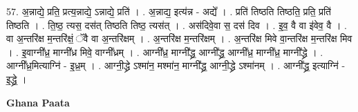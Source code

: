 \documentclass[17pt]{extarticle}
\begin{document}
57. अ॒न्नाद्ये॒ प्रति॒ प्रत्य॒न्नाद्ये॒ ऽन्नाद्ये॒ प्रति॑ । . अ॒न्नाद्य॒ इत्य॑न्न - अद्ये᳚ । . प्रति॑ तिष्ठति तिष्ठति॒ प्रति॒ प्रति॑ तिष्ठति । . ति॒ष्ठ॒ त्यस॒ दस॑त् तिष्ठति तिष्ठ॒ त्यस॑त् । . अस॑दिवे॒वा स॒ दस॑ दिव । . इ॒व॒ वै वा इ॑वेव॒ वै । . वा अ॒न्तरि॑क्ष म॒न्तरि॑क्षं॒ ॅवै वा अ॒न्तरि॑क्षम् । . अ॒न्तरि॑क्ष म॒न्तरि॑क्षम् । . अ॒न्तरि॑क्ष मिवे वा॒न्तरि॑क्ष म॒न्तरि॑क्ष मिव । . इ॒वाग्नी᳚ध्र॒ माग्नी᳚ध्र मिवे॒ वाग्नी᳚ध्रम् । . आग्नी᳚ध्र॒ माग्नी᳚द्ध्र॒ आग्नी᳚द्ध्र॒ आग्नी᳚ध्र॒ माग्नी᳚ध्र॒ माग्नी᳚द्ध्रे । . आग्नी᳚ध्र॒मित्याग्नि॑ - इ॒ध्र॒म् । . आग्नी॒द्ध्रे ऽश्मा॑न॒ मश्मा॑न॒ माग्नी᳚द्ध्र॒ आग्नी॒द्ध्रे ऽश्मा॑नम् । . आग्नी᳚द्ध्र॒ इत्याग्नि॑ - इ॒द्ध्रे॒ । \newline

\textbf{Ghana Paata } \newline
\end{document}
